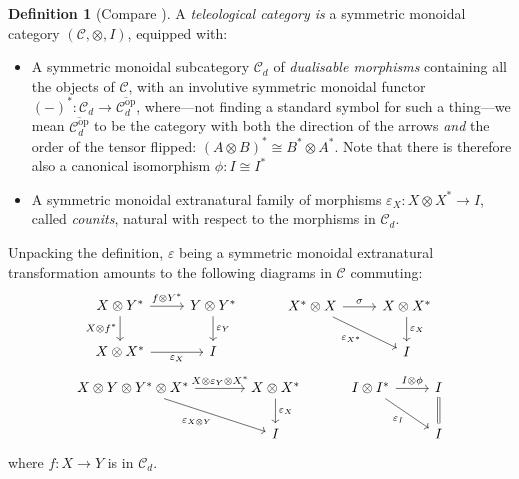 \documentclass[11pt,letterpaper]{article}
\theoremstyle{plain}
\theoremstyle{definition}
\newtheorem{definition}[theorem]{Definition}
\newcommand{\C}{\mathscr{C}}
\newcommand{\op}{\mathrm{op}}
\begin{document}
\begin{definition}[Compare {\cite[Definition 5.1]{CoherenceForLenses}}]
  A \emph{teleological category is} a symmetric monoidal category $(\C, \otimes, I)$, equipped with:
  \begin{itemize}
  \item A symmetric monoidal subcategory $\C_d$ of \emph{dualisable morphisms} containing all the objects of $\C$, with an involutive symmetric monoidal functor ${(-)}^* : \C_d \to \overline{\C_d^\op}$, where---not finding a standard symbol for such a thing---we mean $\overline{\C_d^\op}$ to be the category with both the direction of the arrows \emph{and} the order of the tensor flipped: ${(A \otimes B)}^* \cong B^* \otimes A^*$. Note that there is therefore also a canonical isomorphism $\phi : I \cong I^*$
  \item A symmetric monoidal extranatural family of morphisms $\varepsilon_X : X \otimes X^* \to I$, called \emph{counits}, natural with respect to the morphisms in $\C_d$.
  \end{itemize}
\end{definition}
Unpacking the definition, $\varepsilon$ being a symmetric monoidal extranatural transformation amounts to the following diagrams in $\C$ commuting:
\[
  \begin{tikzcd}
    X \otimes Y^* \ar[r, "f \otimes Y^*"]  \ar[d, "X \otimes f^*", swap] & Y \otimes Y^* \ar[d, "\varepsilon_Y"] \\
    X \otimes X^* \ar[r, "\varepsilon_X", swap] & I
  \end{tikzcd} \hspace{1cm}
  \begin{tikzcd}
    X^* \otimes X \ar[r, "\sigma"]  \ar[dr, "\varepsilon_{X^*}", swap] & X \otimes X^* \ar[d, "\varepsilon_X"] \\
    & I
  \end{tikzcd}\]
\[
  \begin{tikzcd}[column sep = large]
    X \otimes Y \otimes Y^* \otimes X^* \ar[r, "X \otimes \varepsilon_Y \otimes X^*"]  \ar[dr, "\varepsilon_{X \otimes Y}", swap] & X \otimes X^* \ar[d, "\varepsilon_X"] \\
    & I
  \end{tikzcd} \hspace{1cm}
  \begin{tikzcd}
    I \otimes I^* \ar[r,"I \otimes \phi"] \ar[dr, swap, "\varepsilon_I"] & I \ar[d, equal] \\
    & I
  \end{tikzcd}
\]
where $f : X \to Y$ is in $\C_d$.
\end{document}
